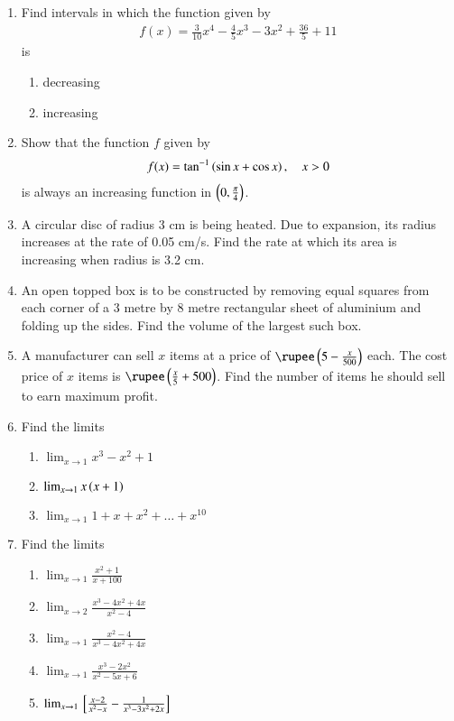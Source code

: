 \begin{enumerate}[label=\arabic*.,ref=\thesubsection.\theenumi]
%
\item Find intervals in which the function given by 
\begin{align}
f(x) = \frac{3}{10}x^4 - \frac{4}{5}x^3-3x^2+\frac{36}{5} + 11 
\end{align}
%
is
%
\begin{enumerate}
\item decreasing 
\item increasing 
\end{enumerate}
%
\item Show that the function $f$ given by 
%
\begin{align}
f(x) = \tan^{-1}\left(\sin x + \cos x\right), \quad x > 0
\end{align}
%
is always an increasing function in $\left(0,\frac{\pi}{4}\right)$.
%
\item  A circular disc of radius 3 cm is being heated. Due to expansion, its radius increases at the rate of 0.05 cm/s. Find the rate at which its area is increasing when radius is 3.2 cm.
%
\item An open topped box is to be constructed by removing equal squares from each corner of a 3 metre by 8 metre rectangular sheet of aluminium and folding up the sides. Find the volume of the largest such box.
%
\item A manufacturer can sell $x$ items at a price of $\rupee \brak{5-\frac{x}{500}}$ each.  The cost price of $x$ items is $\rupee 
\brak{\frac{x}{5}+500}$.  Find the number of items he should sell to earn maximum profit.
%
\item Find the limits 
\begin{enumerate}
\item  $\lim_{x\to 1}x^3-x^2+1$
\item  $\lim_{x\to 1}x\left(x+1\right)$
\item $\lim_{x\to 1}1 +x + x^2 + \dots + x^10$
\end{enumerate}
%
\item Find the limits 
\begin{enumerate}
\item  $\lim_{x\to 1}\frac{x^2+1}{x+100}$
\item  $\lim_{x\to 2}\frac{x^3-4x^2+4x}{x^2-4}$
\item  $\lim_{x\to 1}\frac{x^2-4}{x^3-4x^2+4x}$
\item  $\lim_{x\to 1}\frac{x^3-2x^2}{x^2-5x+6}$
\item  $\lim_{x\to 1}{}\left[\frac{x-2}{x^2-x} - \frac{1}{x^3-3x^2+2x}\right]$
\end{enumerate}

\end{enumerate}
